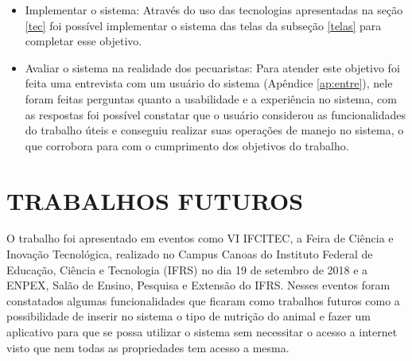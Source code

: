 \begin{itemize}
	\item Implementar o sistema:
	\newline
	Através do uso das tecnologias apresentadas na seção \ref{tec} foi possível implementar o sistema das telas da subseção \ref{telas} para completar esse objetivo.

	\item Avaliar o sistema na realidade dos pecuaristas:
	\newline
	Para atender este objetivo foi feita uma entrevista com um usuário do sistema (Apêndice \ref{ap:entre}), nele foram feitas perguntas quanto a usabilidade e a experiência no sistema, com as respostas foi possível constatar que o usuário considerou as funcionalidades do trabalho úteis e conseguiu realizar suas operações de manejo no sistema, o que corrobora para com o cumprimento dos objetivos do trabalho.
\end{itemize}

\section{TRABALHOS FUTUROS}\label{chap:trabsfuturos}

O trabalho foi apresentado em eventos como VI IFCITEC, a Feira de Ciência e Inovação Tecnológica, realizado no Campus Canoas do Instituto Federal de Educação, Ciência e Tecnologia (IFRS) no dia 19 de setembro de 2018 e a ENPEX, Salão de Ensino, Pesquisa e Extensão do IFRS. Nesses eventos foram constatados algumas funcionalidades que ficaram como trabalhos futuros como a possibilidade de inserir no sistema o tipo de nutrição do animal e fazer um aplicativo para que se possa utilizar o sistema sem necessitar o acesso a internet visto que nem todas as propriedades tem acesso a mesma.
